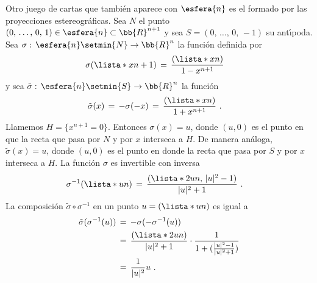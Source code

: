 \begin{ejemplo}
	Otro juego de cartas que tambi\'{e}n aparece con $\esfera{n}$ es
	el formado por las proyecciones estereogr\'{a}ficas. Sea $N$ el
	punto $(0,\,\dots,\,0,\,1)\in\esfera{n}\subset\bb{R}^{n+1}$ y
	sea $S=(0,\,\dots,\,0,\,-1)$ su ant\'{\i}poda. Sea
	$\sigma:\,\esfera{n}\setmin\{N\}\rightarrow\bb{R}^{n}$ la
	funci\'{o}n definida por
	\begin{align*}
		\sigma(\lista*{x}{n+1}) & \,=\,
			\frac{(\lista*{x}{n})}{1-x^{n+1}}
	\end{align*}
	y sea $\tilde{\sigma}:\,\esfera{n}\setmin\{S\}\rightarrow\bb{R}^{n}$
	la funci\'{o}n
	\begin{align*}
		\tilde{\sigma}(x) & \,=\,-\sigma(-x) \,=\,
			\frac{(\lista*{x}{n})}{1+x^{n+1}}
		\text{ .}
	\end{align*}
	Llamemos $H=\{x^{n+1}=0\}$. Entonces $\sigma(x)=u$, donde
	$(u,0)$ es el punto en que la recta que pasa por $N$ y por $x$
	interseca a $H$. De manera an\'{a}loga, $\tilde{\sigma}(x)=u$, donde
	$(u,0)$ es el punto en donde la recta que pasa por $S$ y por $x$
	interseca a $H$. La funci\'{o}n $\sigma$ es invertible con inversa
	\begin{align*}
		\sigma^{-1}(\lista*{u}{n}) & \,=\,
			\frac{(\lista*{2u}{n},\,|u|^{2}-1)}{|u|^{2}+1}
		\text{ .}
	\end{align*}
	La composici\'{o}n $\tilde{\sigma}\circ\sigma^{-1}$ en un punto
	$u=(\lista*{u}{n})$ es igual a
	\begin{align*}
		\tilde{\sigma}(\sigma^{-1}(u)) & \,=\,
			-\sigma(-\sigma^{-1}(u)) \\
		&\,=\,\frac{(\lista*{2u}{n})}{|u|^{2}+1}\cdot
			\frac{1}{1+(\frac{|u|^{2}-1}{|u|^{2}+1})} \\
		& \,=\, \frac{1}{|u|^{2}}u
		\text{ .}
	\end{align*}
\end{ejemplo}

